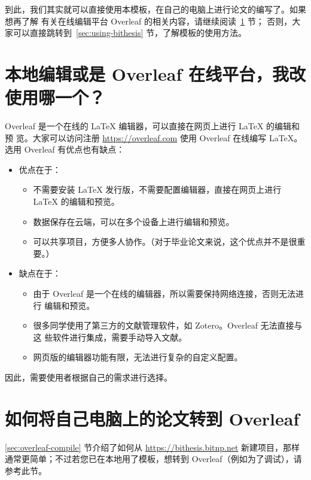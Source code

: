 到此，我们其实就可以直接使用本模板，在自己的电脑上进行论文的编写了。如果想再了解
有关在线编辑平台 Overleaf 的相关内容，请继续阅读~\ref{sec:online-overleaf} 节；
否则，大家可以直接跳转到~\ref{sec:using-bithesis} 节，了解模板的使用方法。

\section{本地编辑或是 Overleaf 在线平台，我改使用哪一个？}
\label{sec:online-overleaf}

Overleaf 是一个在线的 \LaTeX{} 编辑器，可以直接在网页上进行 \LaTeX{} 的编辑和预
览。大家可以访问注册 \url{https://overleaf.com} 使用 Overleaf 在线编写
\LaTeX{}。选用 Overleaf 有优点也有缺点：
\begin{itemize}[noitemsep]
  \item 优点在于：
    \begin{itemize}[noitemsep]
      \item 不需要安装 \LaTeX{} 发行版，不需要配置编辑器，直接在网页上进行
      \LaTeX{} 的编辑和预览。
      \item 数据保存在云端，可以在多个设备上进行编辑和预览。
      \item 可以共享项目，方便多人协作。（对于毕业论文来说，这个优点并不是很重
      要。）
    \end{itemize}
  \item 缺点在于：
    \begin{itemize}[noitemsep]
      \item 由于 Overleaf 是一个在线的编辑器，所以需要保持网络连接，否则无法进行
      编辑和预览。
      \item 很多同学使用了第三方的文献管理软件，如 Zotero。Overleaf 无法直接与这
      些软件进行集成，需要手动导入文献。
      \item 网页版的编辑器功能有限，无法进行复杂的自定义配置。
    \end{itemize}
\end{itemize}

因此，需要使用者根据自己的需求进行选择。

\section{如何将自己电脑上的论文转到 Overleaf}

\ref{sec:overleaf-compile} 节介绍了如何从 \url{https://bithesis.bitnp.net} 新建项目，那样通常更简单；不过若您已在本地用了模板，想转到 Overleaf（例如为了调试），请参考此节。

